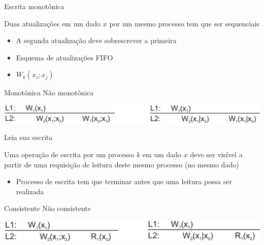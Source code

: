 \documentclass[compress]{beamer}
\begin{document}

\begin{frame}{Escrita monotônica}

Duas atualizações em um dado $x$ por um mesmo processo tem que ser sequenciais
\begin{itemize}
    \item A segunda atualização deve sobrescrever a primeira
    \item Esquema de atualizações FIFO
    \item $W_k(x_i;x_j)$
\end{itemize}

\vspace{1cm}

\centering 

Monotônica \hspace{4cm} Não monotônica

\vspace{.15cm}

\centering \includegraphics[width=\textwidth]{images/mwrite.png}
\end{frame}


\begin{frame}{Leia sua escrita}

Uma operação de escrita por um processo $k$ em um dado $x$ deve ser visível a partir de uma requisição de leitura deste mesmo processo (no mesmo dado)
\begin{itemize}
    \item Processo de escrita tem que terminar antes que uma leitura possa ser realizada
\end{itemize}

\vspace{1cm}

\centering 

Consistente \hspace{4cm} Não consistente

\vspace{.15cm}

\centering \includegraphics[width=\textwidth]{images/readYwrite.png}

\end{frame}
\end{document}
